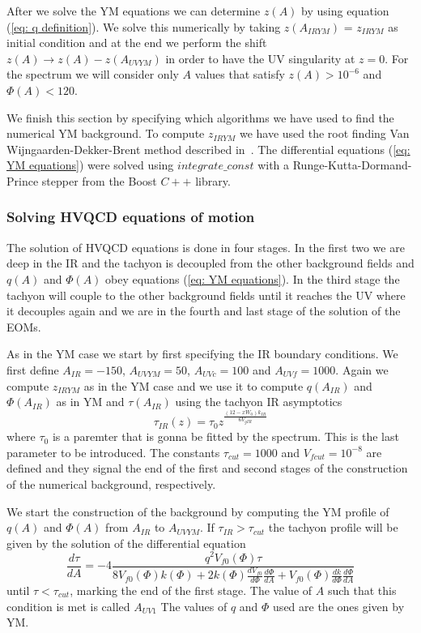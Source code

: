 \documentclass[10 pt]{article}
\begin{document}
After we solve the YM equations we can determine $z\left(A\right)$ by using equation (\ref{eq: q definition}). We solve this numerically by taking $z(A_{IRYM})$ = $z_{IRYM}$ as initial condition and at the end we perform the shift $z\left(A\right) \to z\left(A\right) - z\left(A_{UVYM} \right) $ in order to have the UV singularity at $z = 0$. For the spectrum we will consider only  $A$ values that satisfy $z\left(A\right) > 10^{-6}$ and $\Phi\left(A\right) < 120$.

We finish this section by specifying which algorithms we have used to find the numerical YM background. To compute $z_{IRYM}$ we have used the root finding Van Wijngaarden-Dekker-Brent method described in~\cite{10.5555/1403886}. The differential equations (\ref{eq: YM equations}) were solved using $integrate\_const$ with a Runge-Kutta-Dormand-Prince stepper from the Boost $C++$ library.

\subsubsection{Solving HVQCD equations of motion}

The solution of HVQCD equations is done in four stages. In the first two we are deep in the IR and the tachyon is decoupled from the other background fields and $q\left(A\right)$ and $\Phi\left(A\right)$ obey equations (\ref{eq: YM equations}). In the third stage the tachyon will couple to the other background fields until it reaches the UV where it decouples again and we are in the fourth and last stage of the solution of the EOMs.

As in the YM case we start by first specifying the IR boundary conditions. We first define $A_{IR} = -150$, $A_{UVYM} = 50$, $A_{UVc} = 100$ and $A_{UVf} = 1000$.
Again  we compute $z_{IRYM}$ as in the YM case and we use it to compute $q\left(A_{IR}\right)$ and $\Phi\left(A_{IR}\right)$ as in YM and $\tau\left(A_{IR}\right)$ using the tachyon IR asymptotics
\begin{equation}
\tau_{IR} \left(z \right) = \tau_0 z^{\frac{(12 - x W_0) k_{IR}}{6 V_{gIR}}}
\end{equation}
where $\tau_0$ is a paremter that is gonna be fitted by the spectrum. This is the last parameter to be introduced.
The constants $\tau_{cut} = 1000$ and $V_{f cut} = 10^{-8}$ are defined and they signal the end of the first and second stages of the construction of the numerical background, respectively.

We start the construction of the background by computing the YM profile of $q\left(A\right)$ and $\Phi\left(A\right)$ from $A_{IR}$ to $A_{UVYM}$. If $\tau_{IR} > \tau_{cut}$ the tachyon profile will be given by the solution of the differential equation
\begin{equation}
	\frac{d\tau}{dA} = - 4 \frac{q^2 V_{f0}\left(\Phi\right) \tau}{8 V_{f0}\left( \Phi\right) k\left(\Phi\right) + 2 k\left(\Phi\right) \frac{d V_{f0}}{d\Phi} \frac{d\Phi}{dA} + V_{f0} \left(\Phi\right) \frac{dk}{d\Phi} \frac{d\Phi}{dA} }
\end{equation}
until $\tau < \tau_{cut}$, marking the end of the first stage. The value of $A$ such that this condition is met is called $A_{UV1}$ The values of $q$ and $\Phi$ used are the ones given by YM.
\end{document}
